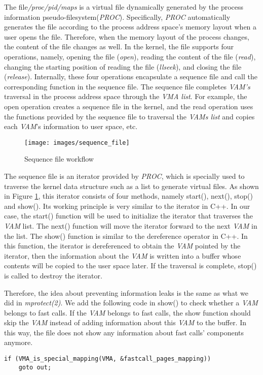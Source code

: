 The file\emph{/proc/pid/maps} is a virtual file dynamically
generated by the process information pseudo-filesystem\cite{23}(\emph{PROC}). 
Specifically, \emph{PROC} automatically generates the file according to 
the process address space's memory layout when a user opens the file. 
Therefore, when the memory layout of the process changes, the content 
of the file changes as well. In the kernel, the file supports four operations, 
namely, opening the file (\emph{open}), reading the content of the file (\emph{read}), 
changing the starting position of reading the file (\emph{llseek}), and 
closing the file (\emph{release}).  Internally, these four operations 
encapsulate a sequence file\cite{24} and call the corresponding function in the sequence file.
The sequence file completes \emph{VAM's} traversal in the process address space 
through the \emph{VMA list}. For example, the open operation 
creates a sequence file in the kernel, and the read operation uses the 
functions provided by the sequence file to traversal the \emph{VAMs list} and copies 
each \emph{VAM}'s information to user space, etc.





\begin{figure}[tbp]
  \centering
  \texttt{[image: images/sequence\_file]}
  \caption[Sequence file workflow]{Sequence file workflow}
  \label{fig:sequence_file}
\end{figure}

The sequence file is an iterator provided by \emph{PROC}, 
which is specially used to traverse the kernel data structure 
such as a list to generate virtual files. As shown in Figure \ref{fig:sequence_file}, this 
iterator consists of four methods, namely start(), next(), stop() 
and show(). Its working principle is very similar to the iterator in C++. 
In our case, the start() function will be used to initialize the iterator 
that traverses the \emph{VAM} list. The next() function will move the iterator 
forward to the next \emph{VAM} in the list. The show() function is similar 
to the dereference operator in C++. In this function,  the iterator is 
dereferenced to obtain the \emph{VAM} pointed by the iterator, then the 
information about the \emph{VAM} is written into a buffer whose contents 
will be copied to the user space later. If the traversal is complete, 
stop() is called to destroy the iterator.

Therefore, the idea about preventing information leaks is the
same as what we did in \emph{mprotect(2)}. We add the following code in show() to 
check whether a \emph{VAM} belongs to fast calls.  If the \emph{VAM} 
belongs to fast calls, the show function should skip the \emph{VAM} 
instead of adding information about this \emph{VAM} to the buffer. 
In this way, the file does not show any information about 
fast calls' components anymore.



\begin{lstlisting}[style=CStyle]
  if (VMA_is_special_mapping(VMA, &fastcall_pages_mapping))
    goto out;
\end{lstlisting}


\cleardoublepage





